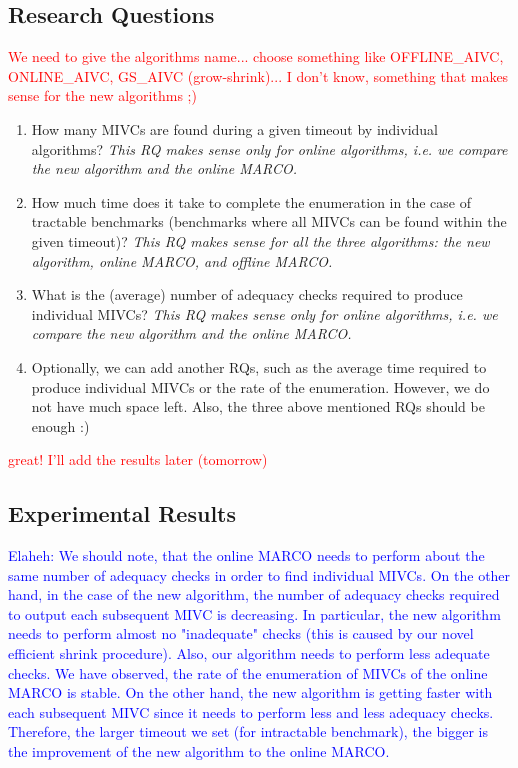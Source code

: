 \subsection{Research Questions}
\textcolor{red}{We need to give the algorithms name... choose something like OFFLINE\_AIVC, ONLINE\_AIVC, GS\_AIVC (grow-shrink)... I don't know, something that makes sense for the new algorithms ;) }
\begin{enumerate}
	\item How many MIVCs are found during a given timeout by individual algorithms? \emph{This RQ makes sense only for online algorithms, i.e. we compare the new algorithm and the online MARCO.}
	\item How much time does it take to complete the enumeration in the case of tractable benchmarks (benchmarks where all MIVCs can be found within the given timeout)? \emph{This RQ makes sense for all the three algorithms: the new algorithm, online MARCO, and offline MARCO.}
	\item What is the (average) number of adequacy checks required to produce individual MIVCs? \emph{This RQ makes sense only for online algorithms, i.e. we compare the new algorithm and the online MARCO.}
	\item Optionally, we can add another RQs, such as the average time required to produce individual MIVCs or the rate of the enumeration. However, we do not have much space left. Also, the three above mentioned RQs should be enough :) 
\end{enumerate}
\textcolor{red}{great! I'll add the results later (tomorrow) }

\subsection{Experimental Results}
\textcolor{blue}{Elaheh: We should note, that the online MARCO needs to perform about the same number of adequacy checks in order to find individual MIVCs. On the other hand, in the case of the new algorithm, the number of adequacy checks required to output each subsequent MIVC is decreasing. In particular, the new algorithm needs to perform almost no "inadequate" checks (this is caused by our novel efficient shrink procedure). Also, our algorithm needs to perform less adequate checks. We have observed, the rate of the enumeration of MIVCs of the online MARCO is stable. On the other hand, the new algorithm is getting faster with each subsequent MIVC since it needs to perform less and less adequacy checks. Therefore, the larger timeout we set (for intractable benchmark), the bigger is the improvement of the new algorithm to the online MARCO.}


